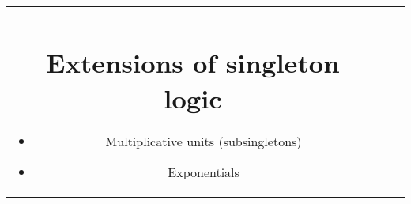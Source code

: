 \begin{figure*}
\begin{tabular}{ccc}
\begin{description}
\end{description}







\section{Extensions of singleton logic}\label{sec:singleton-logic:extensions}

\begin{itemize}
\item Multiplicative units (subsingletons)
\item Exponentials
\end{itemize}


\end{tabular}
\end{figure*}
